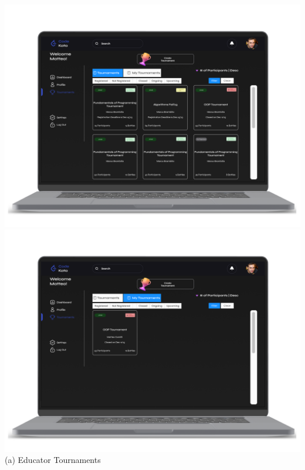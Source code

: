 \begin{center}
\includegraphics[scale=0.13]{Images/ui-ux/educator_tournaments/educator_tournaments_1.png}
\includegraphics[scale=0.13]{Images/ui-ux/educator_tournaments/educator_tournaments_2.png}
        (a) Educator Tournaments
\end{center}
